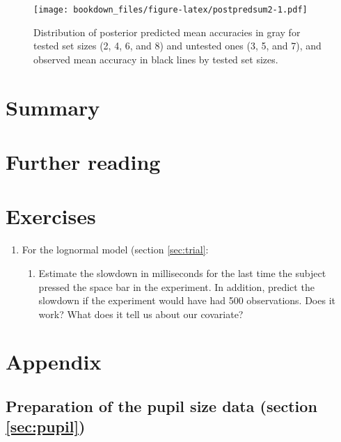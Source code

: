 \documentclass[12pt,]{krantz}
\providecommand{\tightlist}{%
  \setlength{\itemsep}{0pt}\setlength{\parskip}{0pt}}
\theoremstyle{definition}
\theoremstyle{definition}
\theoremstyle{definition}
\theoremstyle{remark}
\begin{document}
\begin{figure}
\centering
\texttt{[image: bookdown\_files/figure-latex/postpredsum2-1.pdf]}
\caption{\label{fig:postpredsum2}Distribution of posterior predicted mean accuracies in gray for tested set sizes (2, 4, 6, and 8) and untested ones (3, 5, and 7), and observed mean accuracy in black lines by tested set sizes.}
\end{figure}

\hypertarget{summary-1}{%
\section{Summary}\label{summary-1}}

\hypertarget{further-reading-3}{%
\section{Further reading}\label{further-reading-3}}

\hypertarget{exercises-3}{%
\section{Exercises}\label{exercises-3}}

\begin{enumerate}
\def\labelenumi{\arabic{enumi}.}
\tightlist
\item
  For the lognormal model (section \ref{sec:trial}:

  \begin{enumerate}
  \def\labelenumii{\arabic{enumii}.}
  \tightlist
  \item
    Estimate the slowdown in milliseconds for the last time the subject pressed the space bar in the experiment. In addition, predict the slowdown if the experiment would have had 500 observations. Does it work? What does it tell us about our covariate?
  \end{enumerate}
\end{enumerate}

\hypertarget{appendix-1}{%
\section{Appendix}\label{appendix-1}}

\hypertarget{sec:preprocessingpupil}{%
\subsection{Preparation of the pupil size data (section \ref{sec:pupil})}\label{sec:preprocessingpupil}}
\end{document}
